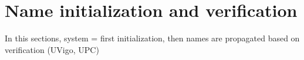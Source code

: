 \section{Name initialization and verification}
\label{sec:verification}

In this sections, system = first initialization, then names are propagated based on verification (UVigo, UPC)

\endinput
